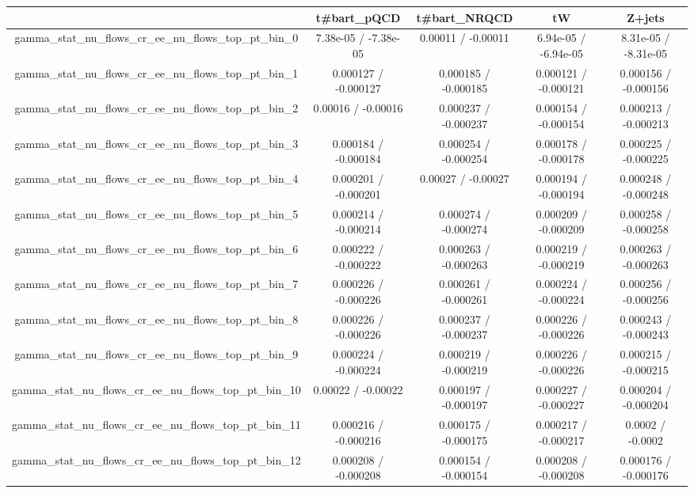 \documentclass[10pt]{article}
\begin{document}
\begin{table}[htbp]
\begin{center}
\begin{tabular}{|c|c|c|c|c|}
\hline 
      & t#bar{t}_{pQCD}      & t#bar{t}_{NRQCD}      & tW      & Z+jets \\ 
\hline 
  gamma_stat_nu_flows_cr_ee_nu_flows_top_pt_bin_0 & 7.38e-05 / -7.38e-05 & 0.00011 / -0.00011 & 6.94e-05 / -6.94e-05 & 8.31e-05 / -8.31e-05 \\ 
  gamma_stat_nu_flows_cr_ee_nu_flows_top_pt_bin_1 & 0.000127 / -0.000127 & 0.000185 / -0.000185 & 0.000121 / -0.000121 & 0.000156 / -0.000156 \\ 
  gamma_stat_nu_flows_cr_ee_nu_flows_top_pt_bin_2 & 0.00016 / -0.00016 & 0.000237 / -0.000237 & 0.000154 / -0.000154 & 0.000213 / -0.000213 \\ 
  gamma_stat_nu_flows_cr_ee_nu_flows_top_pt_bin_3 & 0.000184 / -0.000184 & 0.000254 / -0.000254 & 0.000178 / -0.000178 & 0.000225 / -0.000225 \\ 
  gamma_stat_nu_flows_cr_ee_nu_flows_top_pt_bin_4 & 0.000201 / -0.000201 & 0.00027 / -0.00027 & 0.000194 / -0.000194 & 0.000248 / -0.000248 \\ 
  gamma_stat_nu_flows_cr_ee_nu_flows_top_pt_bin_5 & 0.000214 / -0.000214 & 0.000274 / -0.000274 & 0.000209 / -0.000209 & 0.000258 / -0.000258 \\ 
  gamma_stat_nu_flows_cr_ee_nu_flows_top_pt_bin_6 & 0.000222 / -0.000222 & 0.000263 / -0.000263 & 0.000219 / -0.000219 & 0.000263 / -0.000263 \\ 
  gamma_stat_nu_flows_cr_ee_nu_flows_top_pt_bin_7 & 0.000226 / -0.000226 & 0.000261 / -0.000261 & 0.000224 / -0.000224 & 0.000256 / -0.000256 \\ 
  gamma_stat_nu_flows_cr_ee_nu_flows_top_pt_bin_8 & 0.000226 / -0.000226 & 0.000237 / -0.000237 & 0.000226 / -0.000226 & 0.000243 / -0.000243 \\ 
  gamma_stat_nu_flows_cr_ee_nu_flows_top_pt_bin_9 & 0.000224 / -0.000224 & 0.000219 / -0.000219 & 0.000226 / -0.000226 & 0.000215 / -0.000215 \\ 
  gamma_stat_nu_flows_cr_ee_nu_flows_top_pt_bin_10 & 0.00022 / -0.00022 & 0.000197 / -0.000197 & 0.000227 / -0.000227 & 0.000204 / -0.000204 \\ 
  gamma_stat_nu_flows_cr_ee_nu_flows_top_pt_bin_11 & 0.000216 / -0.000216 & 0.000175 / -0.000175 & 0.000217 / -0.000217 & 0.0002 / -0.0002 \\ 
  gamma_stat_nu_flows_cr_ee_nu_flows_top_pt_bin_12 & 0.000208 / -0.000208 & 0.000154 / -0.000154 & 0.000208 / -0.000208 & 0.000176 / -0.000176 \\ 

\end{tabular}
\end{center}
\end{table}
\end{document}

